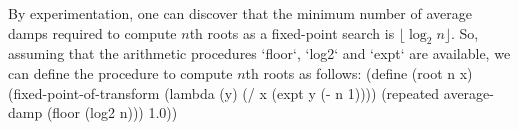 By experimentation, one can discover that the minimum number of average damps required to compute $n$th roots as a fixed-point search is $\lfloor\log_2 n \rfloor$.  So, assuming that the arithmetic procedures `floor`, `log2` and `expt` are available, we can define the procedure to compute $n$th roots as follows:
\begtt\scm
(define (root n x)
  (fixed-point-of-transform (lambda (y) (/ x (expt y (- n 1))))
                            (repeated average-damp (floor (log2 n)))
                            1.0))
\endtt
